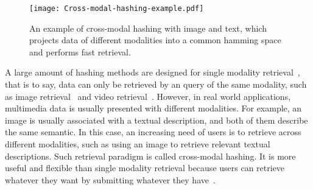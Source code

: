 \documentclass[journal]{IEEEtran}
\begin{document}
\begin{figure}[tb]
	\centering
	\texttt{[image: Cross-modal-hashing-example.pdf]}
	\caption{An example of cross-modal hashing with image and text, which projects data of different modalities into a common hamming space and performs fast retrieval.}
	\label{intro}
\end{figure}

A large amount of hashing methods are designed for single modality retrieval~\cite{lsh_vldb,agh_icml,imagehashsurvey,llh_cvpr,ninh_cvpr,sdh_cvpr,sh_nips,ssh_cvpr}, that is to say, data can only be retrieved by an query of the same modality, such as image retrieval~\cite{imagehashsurvey} and video retrieval~\cite{videohashing}. However, in real world applications, multimedia data is usually presented with different modalities. For example, an image is usually associated with a textual description, and both of them describe the same semantic. In this case, an increasing need of users is to retrieve across different modalities, such as using an image to retrieve relevant textual descriptions. Such retrieval paradigm is called cross-modal hashing. It is more useful and flexible than single modality retrieval because users can retrieve whatever they want by submitting whatever they have~\cite{crossmeidaretrieval_intro}.
\end{document}
